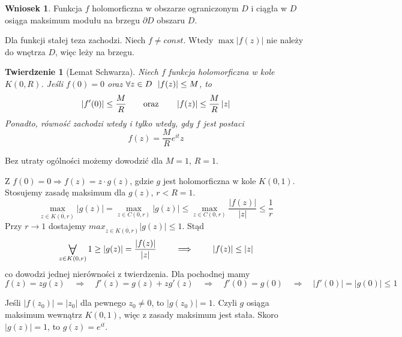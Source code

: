 \documentclass[11pt]{article}
\newcommand{\abs}[1]{\left|#1\right|} %
\newcommand{\closure}[1]{\overline{#1}} %
\newcommand{\Forall}[1]{\mathop{\vcenter{\hbox{\LARGE$\forall$}}}\limits_{#1}} %
\theoremstyle{plain}
\newtheorem*{theorem}{Twierdzenie}
\theoremstyle{definition}
\newtheorem*{corollary}{Wniosek}
\theoremstyle{remark}
\let\oldendproof\endproof
\renewenvironment{proof}[1][\proofname]{
  \oldproof[\textsc{\small #1}]
}{\oldendproof}
\begin{document}
\begin{corollary}
  Funkcja $f$ holomorficzna w obszarze ograniczonym $D$ i ciągła w $D$ osiąga maksimum modułu na brzegu $\partial D$ obszaru $D$.
\end{corollary}

\begin{proof}
  Dla funkcji stałej teza zachodzi.
  Niech $ f \neq const $.
  Wtedy $ \max\abs{f(z)} $ nie należy do wnętrza $D$, więc leży na brzegu.
\end{proof}

\begin{theorem}[Lemat Schwarza]
  Niech $ f $ funkcja holomorficzna w kole $ K(0, R) $.
  Jeśli $ f(0) = 0 $ oraz $ \forall z \in D\enskip\abs{f(z)} \leq M $, to
  $$
    \abs{f'(0)} \leq \frac{M}{R}
    \qquad \textnormal{oraz} \qquad
    \abs{f(z)} \leq \frac{M}{R}\abs{z}
  $$
  Ponadto, równość zachodzi wtedy i tylko wtedy, gdy $ f $ jest postaci
  $$
    f(z) = \frac{M}{R}e^{it}z
  $$
\end{theorem}

\begin{proof}
  Bez utraty ogólności możemy dowodzić dla $ M = 1 $, $ R = 1 $.

  Z $ f(0) = 0 \Rightarrow f(z) = z \cdot g(z) $, gdzie $g$ jest holomorficzna w kole $ K(0,1) $.
  Stosujemy zasadę maksimum dla $ g(z) $, $ r < R = 1 $.
  $$
    \max_{z \in \closure{K(0, r)}} \abs{g(z)} =
    \max_{z \in C(0, r)} \abs{g(z)}
    \leq \max_{z \in C(0, r)} \frac{\abs{f(z)}}{\abs{z}}
    \leq \frac{1}{r}
  $$
  Przy $ r \to 1 $ dostajemy $ max_{z \in \closure{K(0, r)}} \abs{g(z)} \leq 1 $.
  Stąd
  $$
    \Forall{z \in K(0, r)} 1 \geq \abs{g(z)}
    = \frac{\abs{f(z)}}{\abs{z}}
    \qquad \implies \qquad
    \abs{f(z)} \leq \abs{z}
  $$
  co dowodzi jednej nierówności z twierdzenia.
  Dla pochodnej mamy
  $$
    f(z) = zg(z)
    \quad\Rightarrow\quad
    f'(z) = g(z) + zg'(z)
    \quad\Rightarrow\quad
    f'(0) = g(0)
    \quad\Rightarrow\quad
    \abs{f'(0)} = \abs{g(0)}
    \leq 1
  $$

  Jeśli $ \abs{f(z_0)} = \abs{z_0} $ dla pewnego $ z_0 \neq 0 $, to $ \abs{g(z_0)} = 1 $.
  Czyli $ g $ osiąga maksimum wewnątrz $ K(0, 1) $, więc z zasady maksimum jest stała.
  Skoro $ \abs{g(z)} = 1 $, to $ g(z) = e^{it} $.
\end{proof}
\end{document}
